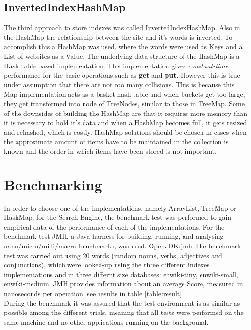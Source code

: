 \subsection{InvertedIndexHashMap}
The third approach to store indexes was called InvertedIndexHashMap. Also in the HashMap the relationship between the site and it's words is inverted. To accomplish this a HashMap was used, where the words were used as Keys and  a List of websites as a Value.
The underlying data structure of the HashMap is a Hash table based implementation. This implementation gives \textit{constant-time} performance for the basic operations such as \textbf{get} and \textbf{put}. \cite{oracle:hashmap} However this is true under assumption that there are not too many collisions. This is because this Map implementation acts as a basket hash table and when buckets get too large, they get transformed into node of  TreeNodes, similar to those in TreeMap. \cite{baeldung:HashTreeCompared} Some of the downsides of building the HashMap are that it requires more memory than it is necessary to hold it's data and when a HashMap becomes full, it gets resized and rehashed, which is costly. HashMap solutions should be chosen in cases when the approximate amount of items have to be maintained in the collection is known and the order in which items have been stored is not important. \cite{baeldung:HashTreeCompared}


\section{Benchmarking}

In order to choose one of the implementations, namely ArrayList, TreeMap or HashMap, for the Search Engine, the benchmark test was performed to gain empirical data of the performance of each of the implementations. For the benchmark test JMH, a Java harness for building, running, and analysing nano/micro/milli/macro benchmarks, was used. {OpenJDK:jmh} The benchmark  test was carried out using 20 words (random nouns, verbs, adjectives and conjunctions), which were looked-up using the three different indexes implementations and in three differnt size databases: enwiki-tiny, enwiki-small, enwiki-medium. JMH provides information about an average Score, measured in nanoseconds per operation, see results in  table \ref{table:result}\\
During the benchmark it was assured that the test environment is as similar as possible among the different trials, meaning that all tests were performed on the same machine and no other applications running on the background.

